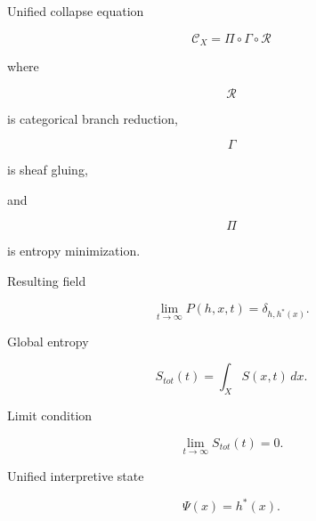 \documentclass[11pt]{article}
\begin{document}
Unified collapse equation

\[
\mathcal{C}_X
=
\Pi
\circ
\Gamma
\circ
\mathcal{R}
\]

where

\[
\mathcal{R}
\]

is categorical branch reduction,

\[
\Gamma
\]

is sheaf gluing,

and

\[
\Pi
\]

is entropy minimization.

Resulting field

\[
\lim_{t\to\infty}
P(h,x,t)
=
\delta_{h,h^*(x)}.
\]

Global entropy

\[
S_{tot}(t)
=
\int_X S(x,t)\,dx.
\]

Limit condition

\[
\lim_{t\to\infty}
S_{tot}(t)
=
0.
\]

Unified interpretive state

\[
\Psi(x)
=
h^*(x).
\]
\end{document}
